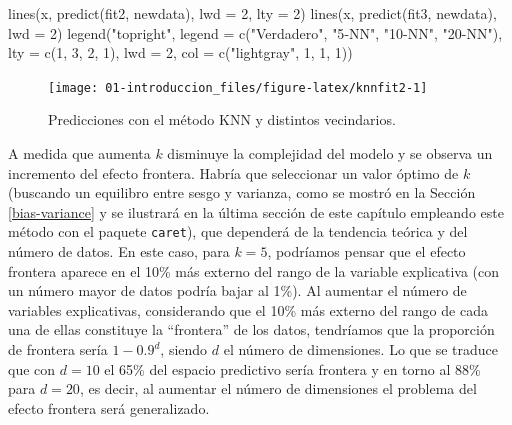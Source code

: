 \documentclass[
]{book}
\newenvironment{Shaded}{\begin{snugshade}}{\end{snugshade}}
\newcommand{\AttributeTok}[1]{\textcolor[rgb]{0.77,0.63,0.00}{#1}}
\newcommand{\DecValTok}[1]{\textcolor[rgb]{0.00,0.00,0.81}{#1}}
\newcommand{\FunctionTok}[1]{\textcolor[rgb]{0.00,0.00,0.00}{#1}}
\newcommand{\NormalTok}[1]{#1}
\newcommand{\StringTok}[1]{\textcolor[rgb]{0.31,0.60,0.02}{#1}}
\theoremstyle{break}
\theoremstyle{nonumberplain}
\begin{document}
\begin{Shaded}
\begin{Highlighting}[]
\FunctionTok{lines}\NormalTok{(x, }\FunctionTok{predict}\NormalTok{(fit2, newdata), }\AttributeTok{lwd =} \DecValTok{2}\NormalTok{, }\AttributeTok{lty =} \DecValTok{2}\NormalTok{)}
\FunctionTok{lines}\NormalTok{(x, }\FunctionTok{predict}\NormalTok{(fit3, newdata), }\AttributeTok{lwd =} \DecValTok{2}\NormalTok{)}
\FunctionTok{legend}\NormalTok{(}\StringTok{"topright"}\NormalTok{, }\AttributeTok{legend =} \FunctionTok{c}\NormalTok{(}\StringTok{"Verdadero"}\NormalTok{, }\StringTok{"5{-}NN"}\NormalTok{, }\StringTok{"10{-}NN"}\NormalTok{, }\StringTok{"20{-}NN"}\NormalTok{), }
       \AttributeTok{lty =} \FunctionTok{c}\NormalTok{(}\DecValTok{1}\NormalTok{, }\DecValTok{3}\NormalTok{, }\DecValTok{2}\NormalTok{, }\DecValTok{1}\NormalTok{), }\AttributeTok{lwd =} \DecValTok{2}\NormalTok{, }\AttributeTok{col =} \FunctionTok{c}\NormalTok{(}\StringTok{"lightgray"}\NormalTok{, }\DecValTok{1}\NormalTok{, }\DecValTok{1}\NormalTok{, }\DecValTok{1}\NormalTok{))}
\end{Highlighting}
\end{Shaded}

\begin{figure}[!htb]

{\centering \texttt{[image: 01-introduccion\_files/figure-latex/knnfit2-1]} 

}

\caption{Predicciones con el método KNN y distintos vecindarios.}\label{fig:knnfit2}
\end{figure}

A medida que aumenta \(k\) disminuye la complejidad del modelo y se observa un incremento del efecto frontera.
Habría que seleccionar un valor óptimo de \(k\) (buscando un equilibro entre sesgo y varianza, como se mostró en la Sección \ref{bias-variance} y se ilustrará en la última sección de este capítulo empleando este método con el paquete \texttt{caret}), que dependerá de la tendencia teórica y del número de datos.
En este caso, para \(k=5\), podríamos pensar que el efecto frontera aparece en el 10\% más externo del rango de la variable explicativa (con un número mayor de datos podría bajar al 1\%).
Al aumentar el número de variables explicativas, considerando que el 10\% más externo del rango de cada una de ellas constituye la ``frontera'' de los datos, tendríamos que la proporción de frontera sería \(1-0.9^d\), siendo \(d\) el número de dimensiones.
Lo que se traduce que con \(d = 10\) el 65\% del espacio predictivo sería frontera y en torno al 88\% para \(d=20\), es decir, al aumentar el número de dimensiones el problema del efecto frontera será generalizado.
\end{document}
